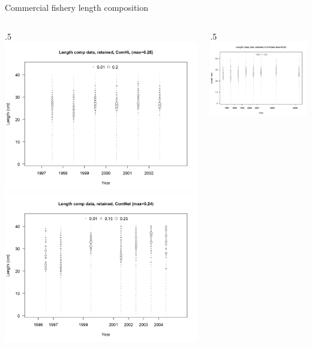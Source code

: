 \documentclass[ignorenonframetext,compress]{beamer}
\def\begincols{\begin{columns}}
\def\begincol{\begin{column}}
\def\endcol{\end{column}}
\def\endcols{\end{columns}}
\begin{document}
\begin{frame}{Commercial fishery length composition}

\begincols
 \begincol{.5\textwidth}
\includegraphics{r4ss/plots_mod1/comp_lendat_bubflt1mkt2.png}
\includegraphics{r4ss/plots_mod1/comp_lendat_bubflt2mkt2.png} \endcol
 \begincol{.5\textwidth}
\includegraphics{r4ss/plots_mod1/comp_lendat_bubflt3mkt2.png} \endcol
\endcols

\end{frame}
\end{document}
